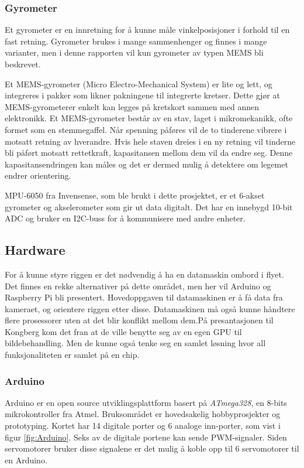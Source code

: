 \subsubsection{Gyrometer}

Et gyrometer er en innretning for å kunne måle vinkelposisjoner i forhold til en fast retning. Gyrometer brukes i mange sammenhenger og finnes i mange varianter, men i denne rapporten vil kun gyrometer av typen MEMS bli beskrevet. 

Et MEMS-gyrometer (Micro Electro-Mechanical System) er lite og lett, og integreres i pakker som likner pakningene til integrerte kretser. Dette gjør at MEMS-gyrometerer enkelt kan legges på kretskort sammen med annen elektronikk. Et MEMS-gyrometer består av en stav, laget i mikromekanikk, ofte formet som en stemmegaffel. Når spenning påføres vil de to tinderene vibrere i motsatt retning av hverandre. Hvis hele staven dreies i en ny retning vil tinderne bli påført motsatt rettetkraft, kapasitansen mellom dem vil da endre seg. Denne kapasitansendringen kan måles og det er dermed mulig å detektere om legemet endrer orientering.\cite{MEMS}

MPU-6050 fra Invensense, som ble brukt i dette prosjektet, er et 6-akset gyrometer og akselerometer som gir ut data digitalt. Det har en innebygd 10-bit ADC og bruker en I2C-buss for å kommunisere med andre enheter.\cite{InSens}

\subsection{Hardware}
For å kunne styre riggen er det nødvendig å ha en datamaskin ombord i flyet. Det finnes en rekke alternativer på dette området, men her vil Arduino og Raspberry Pi bli presentert. Hovedoppgaven til datamaskinen er å få data fra kameraet, og orientere riggen etter disse. Datamaskinen må også kunne håndtere flere prosessorer uten at det blir konflikt mellom dem.På presantasjonen til Kongberg kom det fran at de ville benytte seg av en egen GPU til bildebehandling. Men de kunne også tenke seg en samlet løsning hvor all funksjonaliteten er samlet på en chip.

\subsubsection{Arduino}
Arduino er en open source utviklingsplattform basert på \textit{ATmega328}, en 8-bits mikrokontroller fra Atmel. Bruksområdet er hovedsakelig hobbyprosjekter og prototyping. Kortet har 14 digitale porter og 6 analoge inn-porter, som vist i figur \ref{fig:Arduino}. Seks av de digitale portene kan sende PWM-signaler. Siden servomotorer bruker disse signalene er det mulig å koble opp til 6 servomotorer til en Arduino. 

